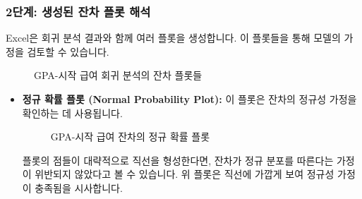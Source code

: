 \documentclass[11pt,a4paper]{book}
\theoremstyle{definition}
\begin{document}
\subsubsection{2단계: 생성된 잔차 플롯 해석}
Excel은 회귀 분석 결과와 함께 여러 플롯을 생성합니다. 이 플롯들을 통해 모델의 가정을 검토할 수 있습니다.

\begin{figure}[h!]
    \centering
    \caption{GPA-시작 급여 회귀 분석의 잔차 플롯들}
    \label{fig:gpa_salary_plots}
\end{figure}

\begin{itemize}
    \item \textbf{정규 확률 플롯 (Normal Probability Plot):}
    이 플롯은 잔차의 정규성 가정을 확인하는 데 사용됩니다.
    \begin{figure}[h!]
        \centering
        \caption{GPA-시작 급여 잔차의 정규 확률 플롯}
        \label{fig:gpa_salary_normal_plot}
    \end{figure}
    \begin{tcolorbox}[colback=lightblue,colframe=darkblue,title={정규성 가정 확인}]
    플롯의 점들이 대략적으로 직선을 형성한다면, 잔차가 정규 분포를 따른다는 가정이 위반되지 않았다고 볼 수 있습니다. 위 플롯은 직선에 가깝게 보여 정규성 가정이 충족됨을 시사합니다.
    \end{tcolorbox}


\end{itemize}
\end{document}
